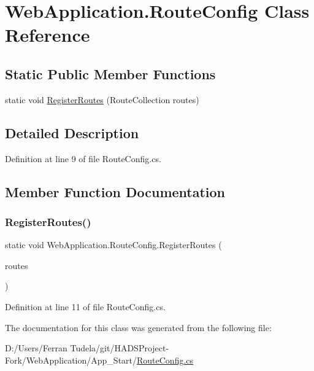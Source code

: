\hypertarget{classWebApplication_1_1RouteConfig}{}\section{Web\+Application.\+Route\+Config Class Reference}
\label{classWebApplication_1_1RouteConfig}
\subsection*{Static Public Member Functions}
\begin{DoxyCompactItemize}
\item 
static void \mbox{\hyperlink{classWebApplication_1_1RouteConfig_a085a3963cf9c9d23bef7dd7c45601d8a}{Register\+Routes}} (Route\+Collection routes)
\end{DoxyCompactItemize}


\subsection{Detailed Description}


Definition at line 9 of file Route\+Config.\+cs.



\subsection{Member Function Documentation}
\mbox{\label{classWebApplication_1_1RouteConfig_a085a3963cf9c9d23bef7dd7c45601d8a}} 
\subsubsection{\texorpdfstring{RegisterRoutes()}{RegisterRoutes()}}
{\footnotesize\ttfamily static void Web\+Application.\+Route\+Config.\+Register\+Routes (\begin{DoxyParamCaption}\item[{Route\+Collection}]{routes }\end{DoxyParamCaption})\hspace{0.3cm}{\ttfamily [static]}}



Definition at line 11 of file Route\+Config.\+cs.



The documentation for this class was generated from the following file\+:\begin{DoxyCompactItemize}
\item 
D\+:/\+Users/\+Ferran Tudela/git/\+H\+A\+D\+S\+Project-\/\+Fork/\+Web\+Application/\+App\+\_\+\+Start/\mbox{\hyperlink{RouteConfig_8cs}{Route\+Config.\+cs}}\end{DoxyCompactItemize}
